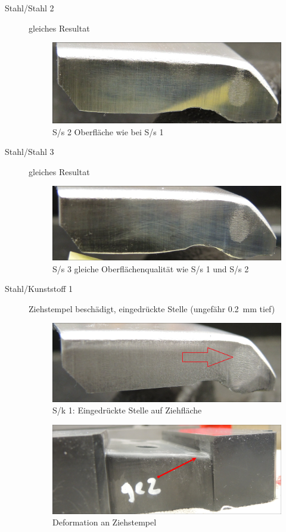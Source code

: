 \documentclass[12pt,a4paper,parskip,twoside,BCOR5mm,headsepline]{scrartcl}
\begin{document}
\begin{description*}
\begin{description}
\item[Stahl/Stahl 2]gleiches Resultat
\begin{figure}[H]
\centering
\includegraphics[width=.8\textwidth]{Ss2}
\caption{S/s 2 Oberfläche wie bei S/s 1}
\label{fig:ss2}
\end{figure}
\item[Stahl/Stahl 3] gleiches Resultat
\begin{figure}[H]
\centering
\includegraphics[width=.8\textwidth]{Ss3}
\caption{S/s 3 gleiche Oberflächenqualität wie S/s 1 und S/s 2}
\label{fig:ss3}
\end{figure}
\item[Stahl/Kunststoff 1] Ziehstempel beschädigt, eingedrückte Stelle (ungefähr \SI{0.2}{\milli\meter} tief)
\begin{figure}[H]
\centering
\includegraphics[width=.8\textwidth]{Sk1}
\caption{S/k 1: Eingedrückte Stelle auf Ziehfläche}
\label{fig:sk1}
\end{figure}
\begin{figure}[H]
\centering
\includegraphics[width=.8\textwidth]{PunchDefektGut}
\caption{Deformation an Ziehstempel}
\label{fig:punchdefect}
\end{figure}


\end{description}
\end{description*}
\end{document}
